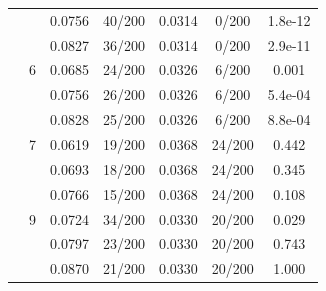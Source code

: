 {\begin{longtable}{llccccc}
 &  & 0.0756 & 40/200 & 0.0314 & 0/200 & 1.8e-12 \\
 &  & 0.0827 & 36/200 & 0.0314 & 0/200 & 2.9e-11 \\
 & 6 & 0.0685 & 24/200 & 0.0326 & 6/200 & 0.001 \\
 &  & 0.0756 & 26/200 & 0.0326 & 6/200 & 5.4e-04 \\
 &  & 0.0828 & 25/200 & 0.0326 & 6/200 & 8.8e-04 \\
 & 7 & 0.0619 & 19/200 & 0.0368 & 24/200 & 0.442 \\
 &  & 0.0693 & 18/200 & 0.0368 & 24/200 & 0.345 \\
 &  & 0.0766 & 15/200 & 0.0368 & 24/200 & 0.108 \\
 & 9 & 0.0724 & 34/200 & 0.0330 & 20/200 & 0.029 \\
 &  & 0.0797 & 23/200 & 0.0330 & 20/200 & 0.743 \\
 &  & 0.0870 & 21/200 & 0.0330 & 20/200 & 1.000 \\
\bottomrule
\end{longtable}}
